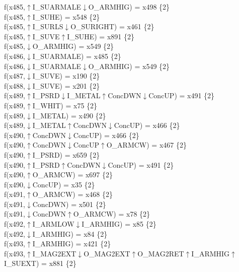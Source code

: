 f(x485,$\uparrow$I\_SUARMALE$\downarrow$O\_ARMHIG) = x498 \{2\} \\  
f(x485,$\uparrow$I\_SUHE) = x548 \{2\} \\  
f(x485,$\uparrow$I\_SURLS$\downarrow$O\_SURIGHT) = x461 \{2\} \\  
f(x485,$\uparrow$I\_SUVE$\uparrow$I\_SUHE) = x891 \{2\} \\  
f(x485,$\downarrow$O\_ARMHIG) = x549 \{2\} \\  
f(x486,$\downarrow$I\_SUARMALE) = x485 \{2\} \\  
f(x486,$\downarrow$I\_SUARMALE$\downarrow$O\_ARMHIG) = x549 \{2\} \\  
f(x487,$\downarrow$I\_SUVE) = x190 \{2\} \\  
f(x488,$\downarrow$I\_SUVE) = x201 \{2\} \\  
f(x489,$\uparrow$I\_PSRD$\downarrow$I\_METAL$\uparrow$ConcDWN$\downarrow$ConcUP) = x491 \{2\} \\  
f(x489,$\uparrow$I\_WHIT) = x75 \{2\} \\  
f(x489,$\downarrow$I\_METAL) = x490 \{2\} \\  
f(x489,$\downarrow$I\_METAL$\uparrow$ConcDWN$\downarrow$ConcUP) = x466 \{2\} \\  
f(x490,$\uparrow$ConcDWN$\downarrow$ConcUP) = x466 \{2\} \\  
f(x490,$\uparrow$ConcDWN$\downarrow$ConcUP$\uparrow$O\_ARMCW) = x467 \{2\} \\  
f(x490,$\uparrow$I\_PSRD) = x659 \{2\} \\  
f(x490,$\uparrow$I\_PSRD$\uparrow$ConcDWN$\downarrow$ConcUP) = x491 \{2\} \\  
f(x490,$\uparrow$O\_ARMCW) = x697 \{2\} \\  
f(x490,$\downarrow$ConcUP) = x35 \{2\} \\  
f(x491,$\uparrow$O\_ARMCW) = x468 \{2\} \\  
f(x491,$\downarrow$ConcDWN) = x501 \{2\} \\  
f(x491,$\downarrow$ConcDWN$\uparrow$O\_ARMCW) = x78 \{2\} \\  
f(x492,$\uparrow$I\_ARMLOW$\downarrow$I\_ARMHIG) = x85 \{2\} \\  
f(x492,$\downarrow$I\_ARMHIG) = x84 \{2\} \\  
f(x493,$\uparrow$I\_ARMHIG) = x421 \{2\} \\  
f(x493,$\uparrow$I\_MAG2EXT$\downarrow$O\_MAG2EXT$\uparrow$O\_MAG2RET$\uparrow$I\_ARMHIG$\uparrow$I\_SUEXT) = x881 \{2\} \\  
